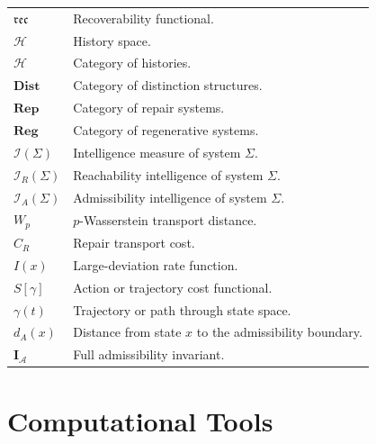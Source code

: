 \documentclass[12pt,twoside,openright]{book}
\newcommand{\hist}{\mathcal{H}}
\newcommand{\reco}{\mathfrak{rec}}
\begin{document}
\begin{center}
\begin{longtable}{p{3cm}p{10cm}}
$\reco$
&
Recoverability functional.
\\

$\hist$
&
History space.
\\

$\mathcal H$
&
Category of histories.
\\

$\mathbf{Dist}$
&
Category of distinction structures.
\\

$\mathbf{Rep}$
&
Category of repair systems.
\\

$\mathbf{Reg}$
&
Category of regenerative systems.
\\

$\mathcal I(\Sigma)$
&
Intelligence measure of system $\Sigma$.
\\

$\mathcal I_R(\Sigma)$
&
Reachability intelligence of system $\Sigma$.
\\

$\mathcal I_A(\Sigma)$
&
Admissibility intelligence of system $\Sigma$.
\\

$W_p$
&
$p$-Wasserstein transport distance.
\\

$C_R$
&
Repair transport cost.
\\

$I(x)$
&
Large-deviation rate function.
\\

$S[\gamma]$
&
Action or trajectory cost functional.
\\

$\gamma(t)$
&
Trajectory or path through state space.
\\

$d_A(x)$
&
Distance from state $x$ to the admissibility boundary.
\\

$\mathbf I_{\mathcal A}$
&
Full admissibility invariant.
\\

\bottomrule
\end{longtable}
\end{center}


\chapter{Computational Tools}
\label{app:comp}
\end{document}
